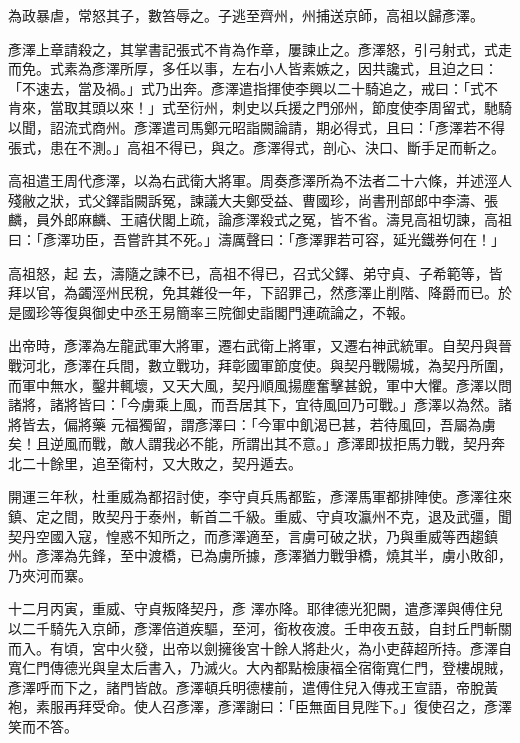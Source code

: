 \begin{pinyinscope}
 為政暴虐，常怒其子，數笞辱之。子逃至齊州，州捕送京師，高祖以歸彥澤。



 彥澤上章請殺之，其掌書記張式不肯為作章，屢諫止之。彥澤怒，引弓射式，式走而免。式素為彥澤所厚，多任以事，左右小人皆素嫉之，因共讒式，且迫之曰：「不速去，當及禍。」式乃出奔。彥澤遣指揮使李興以二十騎追之，戒曰：「式不
 肯來，當取其頭以來！」式至衍州，刺史以兵援之門邠州，節度使李周留式，馳騎以聞，詔流式商州。彥澤遣司馬鄭元昭詣闕論請，期必得式，且曰：「彥澤若不得張式，患在不測。」高祖不得已，與之。彥澤得式，剖心、決口、斷手足而斬之。



 高祖遣王周代彥澤，以為右武衛大將軍。周奏彥澤所為不法者二十六條，并述涇人殘敝之狀，式父鐸詣闕訴冤，諫議大夫鄭受益、曹國珍，尚書刑部郎中李濤、張麟，員外郎麻麟、王禧伏閣上疏，論彥澤殺式之冤，皆不省。濤見高祖切諫，高祖曰：「彥澤功臣，吾嘗許其不死。」濤厲聲曰：「彥澤罪若可容，延光鐵券何在！」



 高祖怒，起
 去，濤隨之諫不已，高祖不得已，召式父鐸、弟守貞、子希範等，皆拜以官，為蠲涇州民稅，免其雜役一年，下詔罪己，然彥澤止削階、降爵而已。於是國珍等復與御史中丞王易簡率三院御史詣閣門連疏論之，不報。



 出帝時，彥澤為左龍武軍大將軍，遷右武衛上將軍，又遷右神武統軍。自契丹與晉戰河北，彥澤在兵間，數立戰功，拜彰國軍節度使。與契丹戰陽城，為契丹所圍，而軍中無水，鑿井輒壞，又天大風，契丹順風揚塵奮擊甚銳，軍中大懼。彥澤以問諸將，諸將皆曰：「今虜乘上風，而吾居其下，宜待風回乃可戰。」彥澤以為然。諸將皆去，偏將藥
 元福獨留，謂彥澤曰：「今軍中飢渴已甚，若待風回，吾屬為虜矣！且逆風而戰，敵人謂我必不能，所謂出其不意。」彥澤即拔拒馬力戰，契丹奔北二十餘里，追至衛村，又大敗之，契丹遁去。



 開運三年秋，杜重威為都招討使，李守貞兵馬都監，彥澤馬軍都排陣使。彥澤往來鎮、定之間，敗契丹于泰州，斬首二千級。重威、守貞攻瀛州不克，退及武彊，聞契丹空國入寇，惶惑不知所之，而彥澤適至，言虜可破之狀，乃與重威等西趨鎮州。彥澤為先鋒，至中渡橋，已為虜所據，彥澤猶力戰爭橋，燒其半，虜小敗卻，乃夾河而寨。



 十二月丙寅，重威、守貞叛降契丹，彥
 澤亦降。耶律德光犯闕，遣彥澤與傅住兒以二千騎先入京師，彥澤倍道疾驅，至河，銜枚夜渡。壬申夜五鼓，自封丘門斬關而入。有頃，宮中火發，出帝以劍擁後宮十餘人將赴火，為小吏薛超所持。彥澤自寬仁門傳德光與皇太后書入，乃滅火。大內都點檢康福全宿衛寬仁門，登樓覘賊，彥澤呼而下之，諸門皆啟。彥澤頓兵明德樓前，遣傅住兒入傳戎王宣語，帝脫黃袍，素服再拜受命。使人召彥澤，彥澤謝曰：「臣無面目見陛下。」復使召之，彥澤笑而不答。




\end{pinyinscope}
